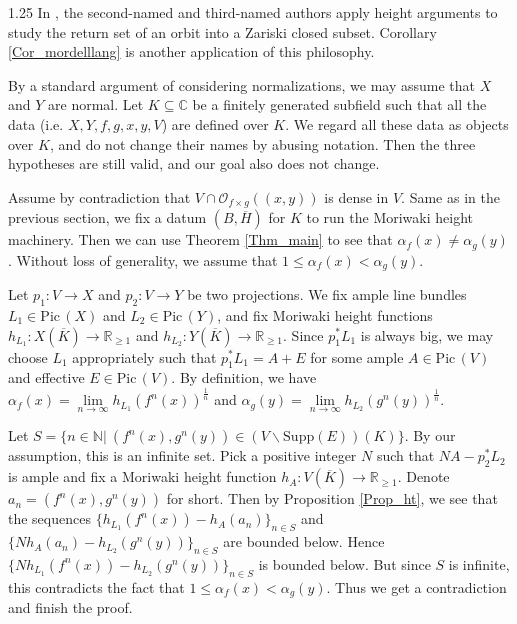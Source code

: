 \documentclass[12pt]{amsart}
\newcommand{\mb}[1]{\mathbb{#1}}
\newcommand\ra{\rightarrow}
\newcommand\Pic{\mathrm{Pic\,}}
\begin{document}
\begin{spacing}{1.25}
In \cite{XY}, the second-named and third-named authors apply height arguments to study the return set of an orbit into a Zariski closed subset. Corollary \ref{Cor_mordelllang} is another application of this philosophy.

By a standard argument of considering normalizations, we may assume that $X$ and $Y$ are normal. Let $K\subseteq\mb{C}$ be a finitely generated subfield such that all the data (i.e. $X,Y,f,g,x,y,V$) are defined over $K$. We regard all these data as objects over $K$, and do not change their names by abusing notation. Then the three hypotheses are still valid, and our goal also does not change.

Assume by contradiction that $V\cap\mathcal{O}_{f\times g}((x,y))$ is dense in $V$. Same as in the previous section, we fix a datum $(B,\overline{H})$ for $K$ to run the Moriwaki height machinery. Then we can use Theorem \ref{Thm_main} to see that $\alpha_f(x)\neq\alpha_g(y)$. Without loss of generality, we assume that $1\leq\alpha_f(x)<\alpha_g(y)$. 

Let $p_1:V\ra X$ and $p_2:V\ra Y$ be two projections. We fix ample line bundles $L_1\in\Pic(X)$ and $L_2\in\Pic(Y)$, and fix Moriwaki height functions $h_{L_1}:X(\overline{K})\ra\mb{R}_{\geq1}$ and $h_{L_2}:Y(\overline{K})\ra\mb{R}_{\geq1}$. Since $p_1^*L_1$ is always big, we may choose $L_1$ appropriately such that $p_1^*L_1=A+E$ for some ample $A\in\Pic(V)$ and effective $E\in\Pic(V)$. By definition, we have $\alpha_f(x)=\lim\limits_{n\ra\infty}h_{L_1}(f^n(x))^{\frac{1}{n}}$ and $\alpha_g(y)=\lim\limits_{n\ra\infty}h_{L_2}(g^n(y))^{\frac{1}{n}}$.

Let $S=\{n\in\mathbb{N}|\ (f^n(x),g^n(y))\in(V\backslash\mathrm{Supp}(E))(K)\}$. By our assumption, this is an infinite set. Pick a positive integer $N$ such that $NA-p_2^*L_2$ is ample and fix a Moriwaki height function $h_A:V(\overline{K})\ra\mb{R}_{\geq1}$. Denote $a_n=(f^n(x),g^n(y))$ for short. Then by Proposition \ref{Prop_ht}, we see that the sequences $\{h_{L_1}(f^n(x))-h_A(a_n)\}_{n\in S}$ and $\{Nh_A(a_n)-h_{L_2}(g^n(y))\}_{n\in S}$ are bounded below. Hence $\{Nh_{L_1}(f^n(x))-h_{L_2}(g^n(y))\}_{n\in S}$ is bounded below. But since $S$ is infinite, this contradicts the fact that $1\leq\alpha_f(x)<\alpha_g(y)$. Thus we get a contradiction and finish the proof.
\endproof











\end{spacing}
\end{document}

